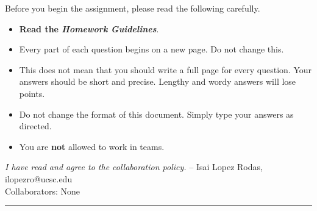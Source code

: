 \documentclass[11pt]{article}
\theoremstyle{definition}
\begin{document}
\noindent
Before you begin the assignment, please read the following carefully.
\begin{itemize}
    \item\textbf{ Read the \emph{Homework Guidelines}}.
    \item Every part of each question begins on a new page. Do not change this.
    \item This does not mean that you should write a full page for every question. Your answers should be short and precise. Lengthy and wordy answers will lose points.
    \item Do not change the format of this document. Simply type your answers as directed.
    \item You are \textbf{not} allowed to work in teams.
\end{itemize}
\emph{I have read and agree to the collaboration policy.}  -- Isai Lopez Rodas, ilopezro@ucsc.edu
\\
Collaborators: None%
\\
\hrule
\end{document}
